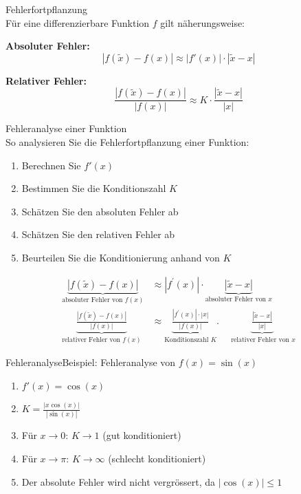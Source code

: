 \begin{theorem}{Fehlerfortpflanzung}\\
Für eine differenzierbare Funktion $f$ gilt näherungsweise:
\vspace{1mm}\\
\begin{minipage}[t]{0.47\textwidth}
    \textbf{Absoluter Fehler:}  $$|f(\tilde{x})-f(x)| \approx |f'(x)| \cdot |\tilde{x}-x|$$
\end{minipage}
\hspace{2mm}
\begin{minipage}[t]{0.43\textwidth}
    \textbf{Relativer Fehler:}  $$\frac{|f(\tilde{x})-f(x)|}{|f(x)|} \approx K \cdot \frac{|\tilde{x}-x|}{|x|}$$
\end{minipage}
\end{theorem}

\begin{KR}{Fehleranalyse einer Funktion}\\
So analysieren Sie die Fehlerfortpflanzung einer Funktion:
\begin{enumerate}
    \item Berechnen Sie $f'(x)$
    \item Bestimmen Sie die Konditionszahl $K$
    \item Schätzen Sie den absoluten Fehler ab
    \item Schätzen Sie den relativen Fehler ab
    \item Beurteilen Sie die Konditionierung anhand von $K$
\end{enumerate}

$$
\begin{aligned}
\underbrace{|f(\tilde{x})-f(x)|}_{\text {absoluter Fehler von } f(x)} & \approx\left|f^{\prime}(x)\right| \cdot \underbrace{|\tilde{x}-x|}_{\text {absoluter Fehler von } x} \\
\underbrace{\frac{|f(\tilde{x})-f(x)|}{|f(x)|}}_{\text {relativer Fehler von } f(x)} & \approx \underbrace{\frac{\left|f^{\prime}(x)\right| \cdot|x|}{|f(x)|}}_{\text {Konditionszahl } K} . \quad \underbrace{\frac{|\tilde{x}-x|}{|x|}}_{\text { relativer Fehler von } x }
\end{aligned}
$$
\end{KR}

\raggedcolumns

\begin{example2}{Fehleranalyse}Beispiel: Fehleranalyse von $f(x)=\sin(x)$
\begin{enumerate}
    \item $f'(x) = \cos(x)$
    \item $K = \frac{|x\cos(x)|}{|\sin(x)|}$
    \item Für $x \to 0$: $K \to 1$ (gut konditioniert)
    \item Für $x \to \pi$: $K \to \infty$ (schlecht konditioniert)
    \item Der absolute Fehler wird nicht vergrössert, da $|\cos(x)| \leq 1$
\end{enumerate}
\end{example2}


